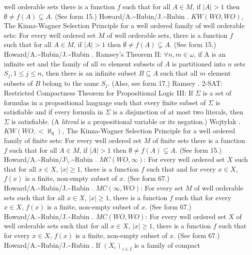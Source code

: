 well orderable sets there is a function $f$ such that for all $A\in M$,
if $|A| > 1$ then $\emptyset\neq f(A)\subsetneq A$.  (See form 15.)
\ac{Howard/A.~Rubin/J.~Rubin}  \cite{1997}.
\medskip
{} $KW(WO,WO)$, The Kinna-Wagner Selection Principle
for a well ordered family of well orderable sets: For every well ordered
set $M$ of well orderable sets, there is a function $f$ such that for all
$A\in M$, if $|A| > 1$ then $\emptyset\neq f(A)\subsetneq A$.
(See form 15.) \ac{Howard/A.~Rubin/J.~Rubin} \cite{1997}.
\medskip
{} Ramsey's Theorem II: $\forall n,m\in\omega$, if
A is an infinite set and the family of all $m$ element subsets of $A$ is
partitioned into $n$ sets $S_{j}, 1\le j\le n$, then there is an infinite
subset $B\subseteq A$ such that all $m$ element subsets of $B$ belong to
the same $S_{j}$. (Also, see form 17.)  \ac{Ramsey} \cite{1929}.
\medskip
{}  2-SAT:  Restricted Compactness Theorem for
Propositional Logic III:   If $\Sigma$ is a set of formulas in a
propositional language such that every finite subset of $\Sigma$
is satisfiable and if every formula in $\Sigma$ is a disjunction
of at most two literals, then $\Sigma$ is satisfiable.
(A {\it literal} is a propositional variable or its negation.)
\ac{Wojtylak} \cite{1995}.
\medskip
{} $KW(WO,<\aleph_0)$,  The Kinna-Wagner Selection
Principle for a well ordered family of finite sets: For every well
ordered set $M$ of finite sets there is a function $f$ such that
for all $A\in M$, if $|A|>1$  then $\emptyset\neq f(A)\subsetneq A$.
(See form 15.) \ac{Howard/A.~Rubin/J\.~Rubin} \cite{1997}.
\medskip
{} $MC(WO,\infty)$: For  every well ordered set
$X$ such that for all $x\in X$, $|x|\ge 1$, there is a function $f$
such that and for every $x\in X$, $f(x)$ is a finite,
non-empty subset of $x$. (See form 67.) \ac{Howard/A.~Rubin/J.~Rubin}
\cite{1997}.
\medskip
{} $MC(\infty,WO)$: For  every set $M$ of well
orderable sets such that for all $x\in X$, $|x|\ge 1$, there is a function
$f$ such that for every $x\in X$, $f(x)$ is a finite, non-empty subset
of $x$.  (See form 67.) \ac{Howard/A.~Rubin/J.~Rubin} \cite{1997}.
\medskip
{} $MC(WO,WO)$: For every well ordered set $X$ of
well orderable sets such that for all $x\in X$, $|x|\ge 1$, there is a
function $f$ such that for every $x\in X$, $f(x)$ is a finite, non-empty
subset of $x$.  (See form 67.) \ac{Howard/A.~Rubin/J.~Rubin} \cite{1997}.
\medskip
{} If $(X_i)_{i\in I}$ is a family of compact
